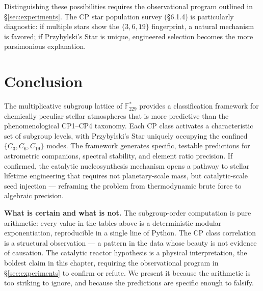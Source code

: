 Distinguishing these possibilities requires the observational program outlined
in \S\ref{sec:experiments}. The CP star population survey (\S6.1.4) is
particularly diagnostic: if multiple stars show the $\{3, 6, 19\}$ fingerprint,
a natural mechanism is favored; if Przybylski's Star is unique, engineered
selection becomes the more parsimonious explanation.


\section{Conclusion}

The multiplicative subgroup lattice of $\mathbb{F}_{229}^*$ provides a
classification framework for chemically peculiar stellar atmospheres that
is more predictive than the phenomenological CP1--CP4 taxonomy. Each CP class
activates a characteristic set of subgroup levels, with Przybylski's Star
uniquely occupying the confined $\{C_3, C_6, C_{19}\}$ modes. The framework
generates specific, testable predictions for astrometric companions, spectral
stability, and element ratio precision. If confirmed, the catalytic
nucleosynthesis mechanism opens a pathway to stellar lifetime engineering
that requires not planetary-scale mass, but catalytic-scale seed injection ---
reframing the problem from thermodynamic brute force to algebraic precision.

\vspace{1em}
\noindent\textbf{What is certain and what is not.}
The subgroup-order computation is pure arithmetic: every value in the tables above is a deterministic modular exponentiation, reproducible in a single line of Python. The CP class correlation is a structural observation --- a pattern in the data whose beauty is not evidence of causation. The catalytic reactor hypothesis is a physical interpretation, the boldest claim in this chapter, requiring the observational program in \S\ref{sec:experiments} to confirm or refute. We present it because the arithmetic is too striking to ignore, and because the predictions are specific enough to falsify.
\newline

